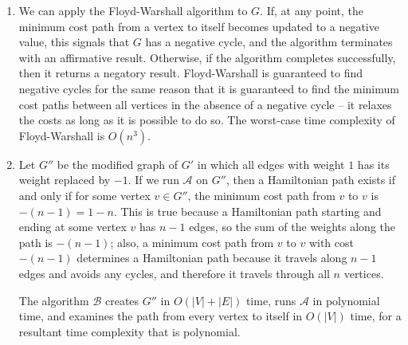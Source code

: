 \documentclass[a4paper,11pt]{article}
\begin{document}
\begin{enumerate}[label=\alph*.]
    \item
        We can apply the Floyd-Warshall algorithm to $G$. If, at any point, the minimum cost path from a vertex to itself becomes updated to a negative value, this signals that $G$ has a negative cycle, and the algorithm terminates with an affirmative result. Otherwise, if the algorithm completes successfully, then it returns a negatory result. Floyd-Warshall is guaranteed to find negative cycles for the same reason that it is guaranteed to find the minimum cost paths between all vertices in the absence of a negative cycle -- it relaxes the costs as long as it is possible to do so. The worst-case time complexity of Floyd-Warshall is $O(n^3)$.

    \item
        Let $G''$ be the modified graph of $G'$ in which all edges with weight $1$ has its weight replaced by $-1$. If we run $\mathcal{A}$ on $G''$, then a Hamiltonian path exists if and only if for some vertex $v \in G''$, the minimum cost path from $v$ to $v$ is $-(n - 1) = 1 - n$. This is true because a Hamiltonian path starting and ending at some vertex $v$ has $n - 1$ edges, so the sum of the weights along the path is $-(n - 1)$; also, a minimum cost path from $v$ to $v$ with cost $-(n - 1)$ determines a Hamiltonian path because it travels along $n - 1$ edges and avoids any cycles, and therefore it travels through all $n$ vertices. \par
        The algorithm $\mathcal{B}$ creates $G''$ in $O(|V| + |E|)$ time, runs $\mathcal{A}$ in polynomial time, and examines the path from every vertex to itself in $O(|V|)$ time, for a resultant time complexity that is polynomial.
\end{enumerate}
\end{document}
